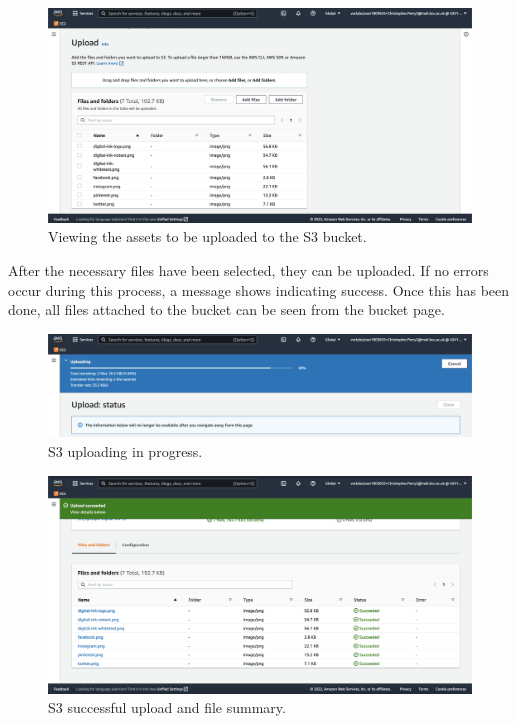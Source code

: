 \begin{figure}[!htbp]
    \centering
    \includegraphics[width=\textwidth]{resources/s3/s3-upload-summary}
    \caption{Viewing the assets to be uploaded to the S3 bucket.}
    \label{fig:s3-upload-summary}
\end{figure}

\pagebreak
After the necessary files have been selected, they can be uploaded.
If no errors occur during this process, a message shows indicating success.
Once this has been done, all files attached to the bucket can be seen from the bucket page.

\begin{figure}[!htbp]
    \centering
    \includegraphics[width=\textwidth]{resources/s3/s3-uploading}
    \caption{S3 uploading in progress.}
    \label{fig:s3-uploading}
\end{figure}

\begin{figure}[!htbp]
    \centering
    \includegraphics[width=\textwidth]{resources/s3/s3-uploaded}
    \caption{S3 successful upload and file summary.}
    \label{fig:s3-uploaded}
\end{figure}

